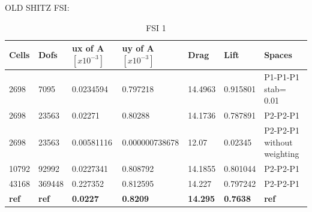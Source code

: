 \newpage
OLD SHITZ FSI:
\begin{table}[h]
\centering
\caption{FSI 1}
\label{my-label}
\begin{tabular}{|l|l|l|l|l|l|l|}
\hline
Cells & Dofs & ux of A $[x10^{-3}]$ & uy of A $[x10^{-3}]$ & Drag & Lift & Spaces \\ \hline
2698 & 7095 & 0.0234594 & 0.797218  & 14.4963 & 0.915801 & P1-P1-P1 stab= 0.01 \\ \hline
2698 & 23563 & 0.02271 & 0.80288 & 14.1736 & 0.787891 & P2-P2-P1 \\ \hline
2698 & 23563 & 0.00581116 & 0.000000738678  & 12.07 & 0.02345 & P2-P2-P1 without weighting \\ \hline
10792 & 92992 & 0.0227341 & 0.808792 & 14.1855 & 0.801044 & P2-P2-P1 \\ \hline
43168 & 369448 & 0.227352 & 0.812595 & 14.227 & 0.797242 & P2-P2-P1 \\ \hline
\textbf{ref} & \textbf{ref} & \textbf{0.0227} & \textbf{0.8209} & \textbf{14.295} & \textbf{0.7638} & \textbf{ref} \\ \hline
\end{tabular}
\end{table}